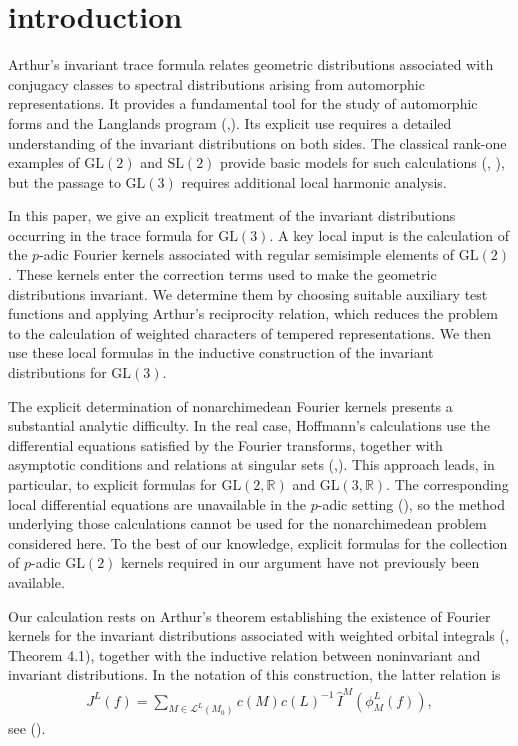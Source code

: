 \documentclass[11pt]{amsart}
\theoremstyle{definition}
\numberwithin{equation}{section}
\begin{document}
	\section{introduction}
	Arthur’s invariant trace formula relates geometric distributions associated with conjugacy classes to spectral distributions arising from automorphic representations. It provides a fundamental tool for the study of automorphic forms and the Langlands program (\cite{Art88(1)},\cite{Art88(2)}). Its explicit use requires a detailed understanding of the invariant distributions on both sides. The classical rank-one examples of \(\mathrm{GL}(2)\) and \(\mathrm{SL}(2)\) provide basic models for such calculations (\cite{Art05}, \cite{AHS86}), but the passage to \(\mathrm{GL}(3)\) requires additional local harmonic analysis.
	
	In this paper, we give an explicit treatment of the invariant distributions occurring in the trace formula for \(\mathrm{GL}(3)\). A key local input is the calculation of the \(p\)-adic Fourier kernels associated with regular semisimple elements of \(\mathrm{GL}(2)\). These kernels enter the correction terms used to make the geometric distributions invariant. We determine them by choosing suitable auxiliary test functions and applying Arthur’s reciprocity relation, which reduces the problem to the calculation of weighted characters of tempered representations. We then use these local formulas in the inductive construction of the invariant distributions for \(\mathrm{GL}(3)\).
	
	The explicit determination of nonarchimedean Fourier kernels presents a substantial analytic difficulty. In the real case, Hoffmann’s calculations use the differential equations satisfied by the Fourier transforms, together with asymptotic conditions and relations at singular sets (\cite{Hof01},\cite{Hof08}). This approach leads, in particular, to explicit formulas for \(\mathrm{GL}(2,\mathbb R)\) and \(\mathrm{GL}(3,\mathbb R)\). The corresponding local differential equations are unavailable in the \(p\)-adic setting (\cite{Art94}), so the method underlying those calculations cannot be used for the nonarchimedean problem considered here. To the best of our knowledge, explicit formulas for the collection of \(p\)-adic \(\mathrm{GL}(2)\) kernels required in our argument have not previously been available.
	
	Our calculation rests on Arthur’s theorem establishing the existence of Fourier kernels for the invariant distributions associated with weighted orbital integrals (\cite{Art94}, Theorem 4.1), together with the inductive relation between noninvariant and invariant distributions. In the notation of this construction, the latter relation is
    \begin{align}\label{descent1}
		J^L(f)=\sum_{M\in\mathcal L^L(M_0)}
		c(M)c(L)^{-1}\,
		\widehat I^M\!\left(\phi_M^L(f)\right),
\end{align}
	see (\cite{Art81}).
	
\end{document}
